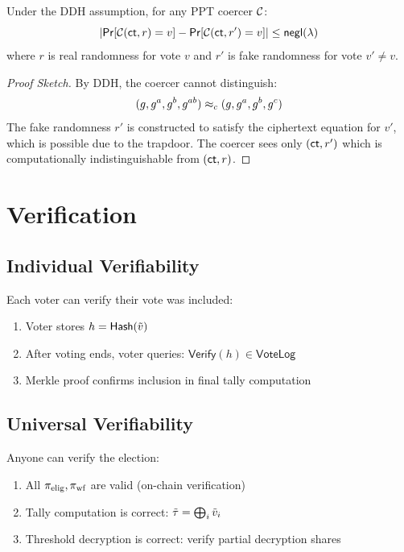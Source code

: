 \documentclass{../shared/luxfhe}
\begin{document}
\begin{theorem}
Under the DDH assumption, for any PPT coercer $\mathcal{C}$:
\[
\left| \mathsf{Pr}[\mathcal{C}(\mathsf{ct}, r) = v] - \mathsf{Pr}[\mathcal{C}(\mathsf{ct}, r') = v] \right| \leq \mathsf{negl}(\lambda)
\]
where $r$ is real randomness for vote $v$ and $r'$ is fake randomness for vote $v' \neq v$.
\end{theorem}

\begin{proof}[Proof Sketch]
By DDH, the coercer cannot distinguish:
\[
(g, g^a, g^b, g^{ab}) \approx_c (g, g^a, g^b, g^c)
\]
The fake randomness $r'$ is constructed to satisfy the ciphertext equation for $v'$, which is possible due to the trapdoor. The coercer sees only $(\mathsf{ct}, r')$ which is computationally indistinguishable from $(\mathsf{ct}, r)$.
\end{proof}

\section{Verification}

\subsection{Individual Verifiability}

Each voter can verify their vote was included:

\begin{enumerate}
    \item Voter stores $h = \mathsf{Hash}(\tilde{v})$
    \item After voting ends, voter queries: $\mathsf{Verify}(h) \in \mathsf{VoteLog}$
    \item Merkle proof confirms inclusion in final tally computation
\end{enumerate}

\subsection{Universal Verifiability}

Anyone can verify the election:

\begin{enumerate}
    \item All $\pi_{\text{elig}}, \pi_{\text{wf}}$ are valid (on-chain verification)
    \item Tally computation is correct: $\tilde{\tau} = \bigoplus_i \tilde{v}_i$
    \item Threshold decryption is correct: verify partial decryption shares
\end{enumerate}
\end{document}
